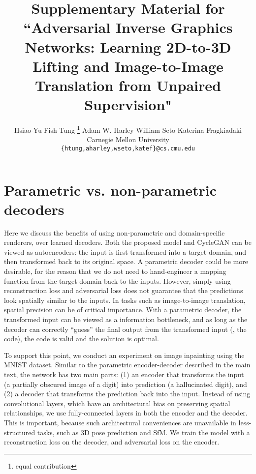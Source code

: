 \documentclass[10pt,twocolumn,letterpaper]{article}
\newcommand*\samethanks[1][\value{footnote}]{\footnotemark[#1]}
\begin{document}
\title{Supplementary Material for \\
``Adversarial Inverse Graphics Networks: Learning 2D-to-3D Lifting and Image-to-Image Translation from Unpaired Supervision"}

\author{Hsiao-Yu Fish Tung \thanks{equal contribution} 
\qquad
Adam W. Harley \samethanks[1] 
\qquad
William Seto \samethanks[1] 
\qquad
Katerina Fragkiadaki
\\
Carnegie Mellon University \\
{\tt\small \{htung,aharley,wseto,katef\}@cs.cmu.edu}
}

\maketitle

\section{Parametric vs. non-parametric decoders}
Here we discuss the benefits of using non-parametric and domain-specific renderers, over learned decoders.
Both the proposed model and CycleGAN \cite{CycleGAN2017} can be viewed as autoencoders: the input is first transformed 
into a target domain, and then transformed back to its original space.
A parametric decoder could be more desirable, for the reason that we do not need to hand-engineer a mapping function from the target domain back to the inputs.
However, simply using reconstruction loss and adversarial loss does not
guarantee that the predictions look spatially similar to the inputs. In tasks such as image-to-image translation, spatial precision can be of critical importance.
With a parametric decoder, the transformed input can be viewed as a information bottleneck, and as long as the decoder can correctly ``guess'' the final output from the transformed input (\ie, the code), the code is valid and the solution is optimal.

To support this point, we conduct an experiment on image inpainting using the MNIST dataset. %
Similar to the parametric encoder-decoder described in the main text, the network has two main parts:
(1) an encoder that transforms the input (a partially obscured image of a digit) into prediction (a hallucinated digit), 
and (2) a decoder
that transforms the prediction back into the input. 
Instead of using convolutional layers, which have an architectural bias on 
preserving spatial relationships, we use fully-connected layers in both the 
encoder and the decoder. This is important, because such architectural conveniences are unavailable in less-structured tasks, such as 3D pose prediction and SfM. 
We train the model with a reconstruction loss on the decoder, and adversarial loss on the encoder.
\end{document}
